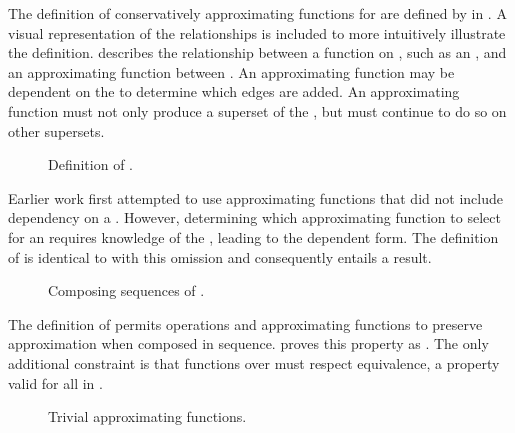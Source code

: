 The definition of conservatively approximating functions for \TMdirAcc{} are defined by \COQdirAccMDep{} in .
A visual representation of the relationships is included to more intuitively illustrate the definition.
\COQdirAccMDep{} describes the relationship between a function on \TMsystemState{}, such as an \TMop{}, and an approximating function between \TMdirAccAGs{}.
An approximating function may be dependent on the \TMsystemState{} to determine which edges are added.
An approximating function must not only produce a superset of the \TMdirAccAG{}, but must continue to do so on other supersets.

\begin{figure}
  \COQDOCdirAccM{}
  \COQDOCdirAccMdirAccMDep{}
  \caption{Definition of \COQdirAccM{}.\label{fig:safety:dirAccM}}
\end{figure}

Earlier work first attempted to use approximating functions that did not include dependency on a \TMsystemState{}.
However, determining which approximating function to select for an \TMop{} requires knowledge of the \TMsystemState{}, leading to the dependent form.
The definition of \COQdirAccM{} is identical to \COQdirAccMDep{} with this omission and consequently entails a \COQdirAccMDep{} result.

\begin{figure}
  \COQDOCdirAccDepCompose{}
  \caption{Composing sequences of \TMdirAcc{} \TMops{}. \label{fig:safety:dirAccMDepComp}}
\end{figure}

The definition of \COQdirAccMDep{} permits operations and approximating functions to preserve approximation when composed in sequence.
 proves this property as \COQdirAccDepCompose{}.
The only additional constraint is that functions over \TMsystemState{} must respect \TMsystemStates{} equivalence, a property valid for all \TMops{} in \TMmodelName{}.

\begin{figure}
  \COQDOCidAG{}
  \COQDOCreadAG{}
  \COQDOCwriteAG{}
  \COQDOCrevokeAG{}
  \COQDOCdestroyAG{}
  \COQDOCdirAccMRead{}
  \COQDOCdirAccMWrite{}
  \COQDOCdirAccMRevoke{}
  \COQDOCdirAccMDestroy{}
  \caption{Trivial approximating functions.\label{fig:safety:dirAccM:trivial}}
\end{figure}

